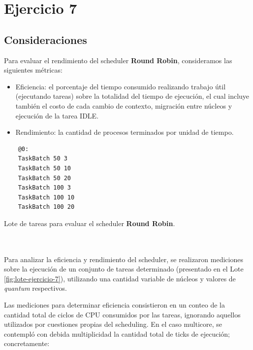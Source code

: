 \section{Ejercicio 7}

\subsection{Consideraciones}

Para evaluar el rendimiento del scheduler \textbf{Round Robin}, consideramos las siguientes métricas:

\begin{itemize}
  \item Eficiencia: el porcentaje del tiempo consumido realizando trabajo útil (ejecutando tareas) sobre la totalidad del tiempo de ejecución, el cual incluye también el costo de cada cambio de contexto, migración entre núcleos y ejecución de la tarea IDLE.
  \item Rendimiento: la cantidad de procesos terminados por unidad de tiempo.
\end{itemize}

\begin{minipage}[t]{0.5\textwidth}
  \begin{tarea}[H]
    \vspace*{2mm}
    \begin{verbatim}
    @0:
    TaskBatch 50 3
    TaskBatch 50 10
    TaskBatch 50 20
    TaskBatch 100 3
    TaskBatch 100 10
    TaskBatch 100 20
    \end{verbatim}
    \vspace*{-5mm}
  \caption{Lote de tareas para evaluar el scheduler \textbf{Round Robin}.}
  \label{fig:lote-ejercicio-7}
  \end{tarea}
\end{minipage}\\\\

Para analizar la eficiencia y rendimiento del scheduler, se realizaron mediciones sobre la ejecución de un conjunto de tareas determinado (presentado en el Lote \ref{fig:lote-ejercicio-7}), utilizando una cantidad variable de núcleos y valores de \textit{quantum} respectivos.

Las mediciones para determinar eficiencia consistieron en un conteo de la cantidad total de ciclos de CPU consumidos por las tareas, ignorando aquellos utilizados por cuestiones propias del scheduling. En el caso multicore, se contempló con debida multiplicidad la cantidad total de ticks de ejecución; concretamente:

